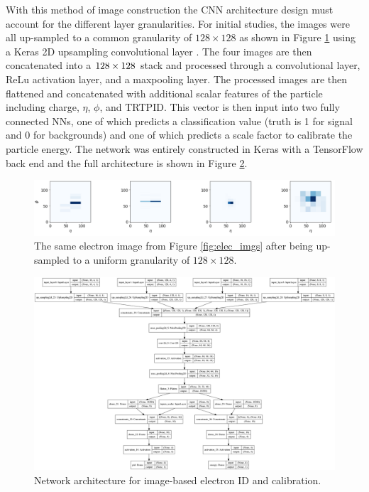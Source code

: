 With this method of image construction the CNN architecture design must account for the different layer granularities. For initial studies, the images were all up-sampled to a common granularity of $128\times128$ as shown in Figure \ref{fig:upsamp_elec_imgs} using a Keras 2D upsampling convolutional layer \cite{keras}. The four images are then concatenated into a $128\times128\time4$ stack and processed through a convolutional layer, ReLu activation layer, and a maxpooling layer. The processed images are then flattened and concatenated with additional scalar features of the particle including charge, $\eta$, $\phi$, and TRTPID. This vector is then input into two fully connected NNs, one of which predicts a classification value (truth is 1 for signal and 0 for backgrounds) and one of which predicts a scale factor to calibrate the particle energy. The network was entirely constructed in Keras with a TensorFlow \cite{tensorflow} back end and the full architecture is shown in Figure \ref{fig:elec_cnn}.\\ 

\pagebreak

\begin{figure}[htb!]
    \centering
    \includegraphics[width=5.5in]{figures/chapter5/upsamp_elec_imgs.png}
    \caption{The same electron image from Figure \ref{fig:elec_imgs} after being up-sampled to a uniform granularity of $128\times128$.}
    \label{fig:upsamp_elec_imgs}
\end{figure}

\begin{figure}[htb!]
    \centering
    \includegraphics[width=5.5in]{figures/chapter5/electron_cnn_network.png}
    \caption{Network architecture for image-based electron ID and calibration.}
    \label{fig:elec_cnn}
\end{figure}

